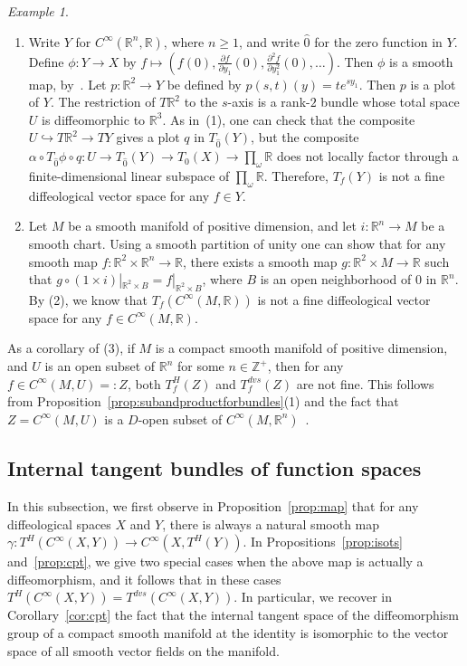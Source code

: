 \documentclass[12pt]{amsart}
\theoremstyle{remark}
\newtheorem{ex}[de]{Example}
\newcommand{\ra}{\to}
\def \Z{\mathbb{Z}}
\def \R{\mathbb{R}}
\begin{document}
\begin{ex}
\begin{enumerate}
\item Write $Y$ for $C^\infty(\R^n,\R)$, where $n \geq 1$,
and write $\hat{0}$ for the zero function in $Y$.
Define $\phi:Y \ra X$ by $f \mapsto (f(0),\frac{\partial f}{\partial y_1}(0),\frac{\partial^2 f}{\partial y_1^2}(0),\ldots)$.
Then $\phi$ is a smooth map, by~\cite[Lemma~4.3]{CSW}.
Let $p:\R^2 \ra Y$ be defined by $p(s,t)(y)=te^{sy_1}$.
Then $p$ is a plot of $Y$.
The restriction of $T\R^2$ to the $s$-axis is a rank-$2$ bundle
whose total space $U$ is diffeomorphic to $\R^3$.
As in~(1), one can check that the composite
$U \hookrightarrow T\R^2 \ra TY$ gives a plot $q$ in $T_{\hat{0}}(Y)$,
but the composite
$\alpha \circ T_{\hat{0}}\phi \circ q:
U \ra T_{\hat{0}}(Y) \ra T_0(X) \ra \prod_\omega \R$
does not locally factor through a finite-dimensional linear subspace
of $\prod_\omega \R$.
Therefore, $T_f(Y)$ is not a
fine diffeological vector space for any $f \in Y$.

\item Let $M$ be a smooth manifold of positive dimension,
and let $i:\R^n \ra M$ be a smooth chart.
Using a smooth partition of unity one can show that for any smooth map $f:\R^2 \times \R^n \ra \R$,
there exists a smooth map $g:\R^2 \times M \ra \R$ such that
$g \circ (1 \times i)|_{\R^2 \times B}=f|_{\R^2 \times B}$,
where $B$ is an open neighborhood of $0$ in $\R^n$.
By (2), we know that $T_f(C^\infty(M,\R))$
is not a fine diffeological vector space
for any $f \in C^\infty(M,\R)$.
%
%
%
%
\end{enumerate}

As a corollary of (3),
if $M$ is a compact smooth manifold of positive dimension,
and $U$ is an open subset of $\R^n$ for some $n \in \Z^+$,
then for any $f \in C^\infty(M,U)=:Z$,
both $T^H_f(Z)$ and $T^{dvs}_f(Z)$ are not fine.
This follows from
Proposition~\ref{prop:subandproductforbundles}(1) and the fact that
$Z=C^\infty(M,U)$ is a $D$-open subset of
$C^\infty(M,\R^n)$~\cite[Proposition~4.2]{CSW}.
\end{ex}


\subsection{Internal tangent bundles of function spaces}\label{ss:function}

In this subsection, we first observe in Proposition~\ref{prop:map}
that for any diffeological spaces $X$ and $Y$,
there is always a natural smooth map $\gamma : T^H(C^\infty(X,Y)) \ra C^\infty(X,T^H (Y))$.
In Propositions~\ref{prop:isots} and~\ref{prop:cpt}, we give two special cases when
the above map is actually a diffeomorphism,
and it follows that in these cases $T^H(C^\infty(X,Y))=T^{dvs}(C^\infty(X,Y))$.
In particular, we recover in Corollary~\ref{cor:cpt}
the fact that the internal tangent space
of the diffeomorphism group of a compact smooth manifold at the identity
is isomorphic to the vector space of all smooth vector fields on the manifold.
\end{document}
